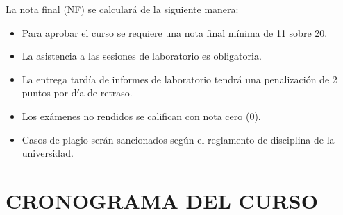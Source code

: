 \documentclass[12pt,a4paper]{article}
\begin{document}
La nota final (NF) se calculará de la siguiente manera:


\begin{tcolorbox}[colback=pucpRojo!5,colframe=pucpRojo,title=\textbf{Políticas de Evaluación}]
\begin{itemize}[leftmargin=*]
    \item Para aprobar el curso se requiere una nota final mínima de 11 sobre 20.
    \item La asistencia a las sesiones de laboratorio es obligatoria.
    \item La entrega tardía de informes de laboratorio tendrá una penalización de 2 puntos por día de retraso.
    \item Los exámenes no rendidos se califican con nota cero (0).
    \item Casos de plagio serán sancionados según el reglamento de disciplina de la universidad.
\end{itemize}
\end{tcolorbox}
\vspace{0.5cm}

\section{CRONOGRAMA DEL CURSO}
\end{document}

